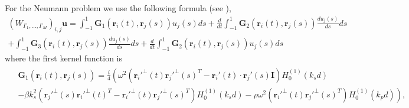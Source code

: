 \documentclass{article}
\newcommand{\bu}{\bm{u}}
\newcommand{\br}{\bm{r}}
\begin{document}
For the Neumann problem we use the following formula (see \cite{tao2021}),
\begin{align}
\label{eq:wstokeexp}
(W_{\Gamma_1,\hdots,\Gamma_M})_{i,j} \bu =  
\int_{-1}^1 \mathbf{G}_1(\br_i(t),\br_j(s))u_j(s) ds+
 \frac{d}{dt} \int_{-1}^1 \mathbf{G}_2(\br_i(t),\br_j(s)) \frac{d u_j(s)}{ds}ds\\+
\int_{-1}^{1} \mathbf{G}_3(\br_i(t),\br_j(s)) \frac{d u_j(s)}{ds}ds+ 
\frac{d}{dt} \int_{-1}^1 \mathbf{G}_2(\br_i(t),\br_j(s)) u_j(s)ds
\end{align}
where the first kernel function is 
\begin{align*}
\begin{split}
&\mathbf{G}_1(\br_i(t),\br_j(s)) = \frac{i}{4}\left( \omega^2(\br_i'^\perp(t)\br_j'^\perp(s)^T-\br_i'(t) \cdot \br_j'(s) \mathbf{I}) H^{(1)}_0(k_s d) \right. \\ 
&\left.-\beta k_s^2(
\br_j'^\perp(s)\br_i'^\perp(t)^T 
-\br_i'^\perp(t)\br_j'^\perp(s)^T)H_0^{(1)}(k_sd) - \rho\omega^2 (\br_i'^\perp(t)\br_j'^\perp(s)^T)H_0^{(1)}(k_p d)\right),
\end{split}
\end{align*}
\end{document}
